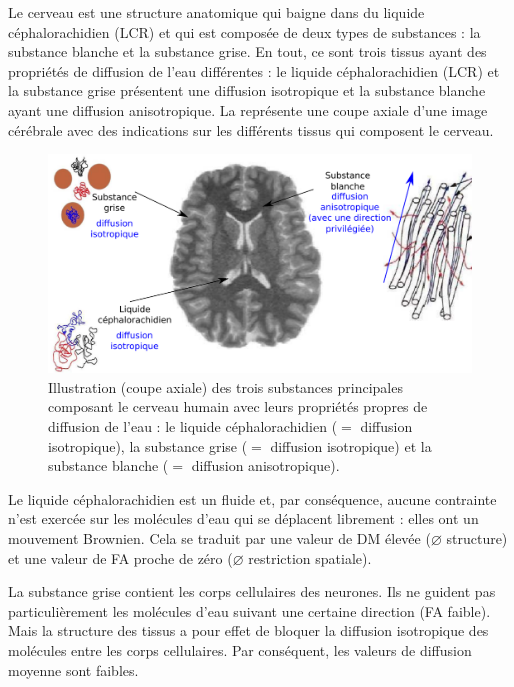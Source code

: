 Le cerveau est une structure anatomique qui baigne dans du liquide céphalorachidien (LCR) 
et qui est composée de deux types de substances : la substance blanche et la substance grise.
En tout, ce sont trois tissus ayant des propriétés de diffusion de l'eau différentes : 
le liquide céphalorachidien (LCR) et la substance grise présentent une diffusion isotropique 
et la substance blanche ayant une diffusion anisotropique.
La  représente une coupe axiale d'une image cérébrale avec des indications 
sur les différents tissus qui composent le cerveau.

\begin{figure}[ht]
    \centering
    \includegraphics[width=1\textwidth]{Images/tissus_fr.pdf}
    \caption{\label{fig:trois_substances}Illustration (coupe axiale) des trois substances principales 
    composant le cerveau humain avec leurs propriétés propres de diffusion de l'eau : 
    le liquide céphalorachidien ($=$ diffusion isotropique), la substance grise ($=$ diffusion isotropique) 
    et la substance blanche ($=$ diffusion anisotropique). }
\end{figure}

Le liquide céphalorachidien est un fluide et, par conséquence, aucune contrainte n'est exercée sur les molécules d'eau 
qui se déplacent librement : elles ont un mouvement Brownien.
Cela se traduit par une valeur de DM élevée ($\varnothing$ structure)
et une valeur de FA proche de zéro ($\varnothing$ restriction spatiale).

La substance grise contient les corps cellulaires des neurones. 
Ils ne guident pas particulièrement les molécules d'eau suivant une certaine direction (FA faible).
Mais la structure des tissus a pour effet de bloquer la diffusion isotropique des molécules entre les corps cellulaires.
Par conséquent, les valeurs de diffusion moyenne sont faibles.

